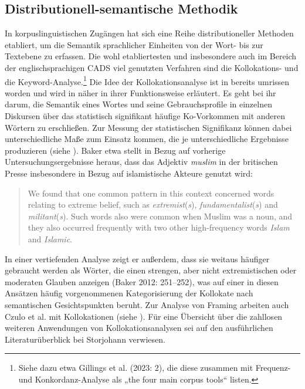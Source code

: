 \subsection{Distributionell-semantische Methodik}\label{distributionell-semantische-methodik}

In korpuslinguistischen Zugängen hat sich eine Reihe distributioneller Methoden etabliert, um die Semantik sprachlicher Einheiten von der Wort- bis zur Textebene zu erfassen. Die wohl etabliertesten und insbesondere auch im Bereich der englischsprachigen CADS viel genutzten Verfahren sind die Kollokations- und die Keyword-Analyse.\footnote{Siehe dazu etwa Gillings et al. (2023: 2), die diese zusammen mit Frequenz- und Konkordanz-Analyse als „the four main corpus tools`` listen.} Die Idee der Kollokationsanalyse ist in  bereits umrissen worden und wird in  näher in ihrer Funktionsweise erläutert. Es geht bei ihr darum, die Semantik eines Wortes und seine Gebrauchsprofile in einzelnen Diskursen über das statistisch signifikant häufige Ko-Vorkommen mit anderen Wörtern zu erschließen. Zur Messung der statistischen Signifikanz können dabei unterschiedliche Maße zum Einsatz kommen, die je unterschiedliche Ergebnisse produzieren (siehe ). Baker etwa stellt in Bezug auf vorherige Untersuchungsergebnisse \autocite{bakerDiscourseAnalysisMedia2013} heraus, dass das Adjektiv \emph{muslim} in der britischen Presse insbesondere in Bezug auf islamistische Akteure genutzt wird:

\begin{quote}
We found that one common pattern in this context concerned words relating to extreme belief, such as \emph{extremist}(\emph{s}), \emph{fundamentalist}(\emph{s}) and \emph{militant}(\emph{s}). Such words also were common when Muslim was a noun, and they also occurred frequently with two other high-frequency words \emph{Islam} and \emph{Islamic}. \autocite[248]{bakerAcceptableBiasUsing2012}
\end{quote}

In einer vertiefenden Analyse zeigt er außerdem, dass sie weitaus häufiger gebraucht werden als Wörter, die einen strengen, aber nicht extremistischen oder moderaten Glauben anzeigen (Baker 2012: 251--252), was auf einer in diesen Ansätzen häufig vorgenommenen Kategorisierung der Kollokate nach semantischen Gesichtspunkten beruht. Zur Analyse von Framing arbeiten auch Czulo et al. \autocite*{czuloEinflussExtremistischerGewaltereignisse2020} mit Kollokationen (siehe ). Für eine Übersicht über die zahllosen weiteren Anwendungen von Kollokationsanalysen sei auf den ausführlichen Literaturüberblick bei Storjohann \autocite*{storjohannKookkurrenzAusKorpuslinguistischer2016} verwiesen.

